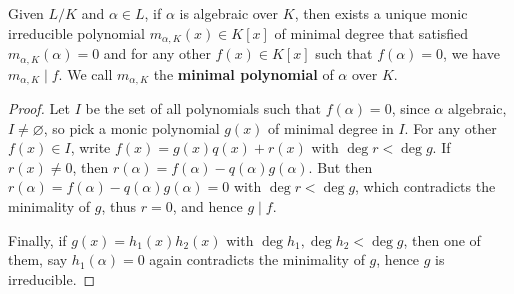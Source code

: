 \begin{prop}
  Given $L/K$ and $\alpha \in L$, if $\alpha$ is algebraic over $K$, then
  exists a unique monic irreducible polynomial $m_{\alpha, K}(x) \in K[x]$ of
  minimal degree that satisfied $m_{\alpha, K}(\alpha) = 0$ and for any other
  $f(x) \in K[x]$ such that $f(\alpha) = 0$, we have $m_{\alpha, K} \mid f$.
  We call $m_{\alpha, K}$ the {\bf minimal polynomial} of $\alpha$ over $K$.

  \begin{proof}

    Let $I$ be the set of all polynomials such that $f(\alpha) = 0$, since $\alpha$ algebraic,
    $I \neq \varnothing$, so pick a monic polynomial $g(x)$ of minimal degree in $I$.
    For any other $f(x) \in I$, write $f(x) = g(x) q(x) + r(x)$ with $\deg r < \deg g$.
    If $r(x) \neq 0$, then $r(\alpha) = f(\alpha) - q(\alpha) g(\alpha)$.
    But then $r(\alpha) = f(\alpha) - q(\alpha) g(\alpha) = 0$ with $\deg r < \deg g$,
    which contradicts the minimality of $g$, thus $r = 0$, and hence $g \mid f$.

    Finally, if $g(x) = h_1(x) h_2(x)$ with $\deg h_1, \deg h_2 < \deg g$,
    then one of them, say $h_1(\alpha) = 0$ again contradicts the minimality of $g$,
    hence $g$ is irreducible.
  \end{proof}
\end{prop}

